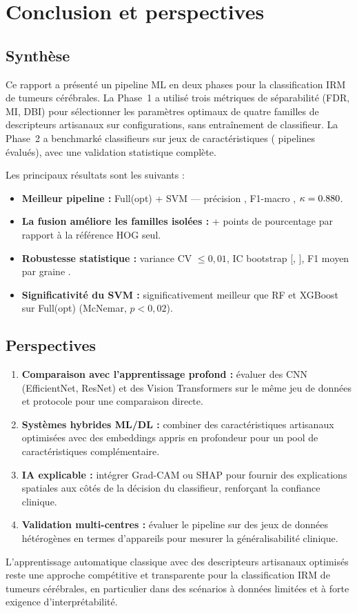 \section{Conclusion et perspectives}
\label{sec:conclusion}

\subsection{Synthèse}

Ce rapport a présenté un pipeline ML en deux phases pour la classification IRM
de tumeurs cérébrales. La Phase~1 a utilisé trois métriques de séparabilité (FDR,
MI, DBI) pour sélectionner les paramètres optimaux de quatre familles de descripteurs
artisanaux sur \NPhaseOneConfigs{} configurations, sans entraînement de classifieur.
La Phase~2 a benchmarké \NModels{} classifieurs sur \NFeatureSets{} jeux de
caractéristiques (\NRuns{} pipelines évalués), avec une validation statistique complète.

Les principaux résultats sont les suivants :
\begin{itemize}
  \item \textbf{Meilleur pipeline :} Full(opt) + SVM --- précision \BestAcc{},
        F1-macro \BestFOne, $\kappa = 0.880$.
  \item \textbf{La fusion améliore les familles isolées :} + \FusionGain{} points
        de pourcentage par rapport à la référence HOG seul.
  \item \textbf{Robustesse statistique :} variance CV $\leq 0{,}01$, IC bootstrap
        [\BestFOneCILow, \BestFOneCIHigh], F1 moyen par graine \SeedFOneMean.
  \item \textbf{Significativité du SVM :} significativement meilleur que RF et
        XGBoost sur Full(opt) (McNemar, $p < 0{,}02$).
\end{itemize}

\subsection{Perspectives}

\begin{enumerate}
  \item \textbf{Comparaison avec l'apprentissage profond :} évaluer des CNN
        (EfficientNet, ResNet) et des Vision Transformers sur le même jeu de données
        et protocole pour une comparaison directe.
  \item \textbf{Systèmes hybrides ML/DL :} combiner des caractéristiques artisanaux
        optimisées avec des embeddings appris en profondeur pour un pool de
        caractéristiques complémentaire.
  \item \textbf{IA explicable :} intégrer Grad-CAM ou SHAP pour fournir des
        explications spatiales aux côtés de la décision du classifieur, renforçant
        la confiance clinique.
  \item \textbf{Validation multi-centres :} évaluer le pipeline sur des jeux de
        données hétérogènes en termes d'appareils pour mesurer la généralisabilité clinique.
\end{enumerate}

L'apprentissage automatique classique avec des descripteurs artisanaux optimisés
reste une approche compétitive et transparente pour la classification IRM de
tumeurs cérébrales, en particulier dans des scénarios à données limitées et à
forte exigence d'interprétabilité.
